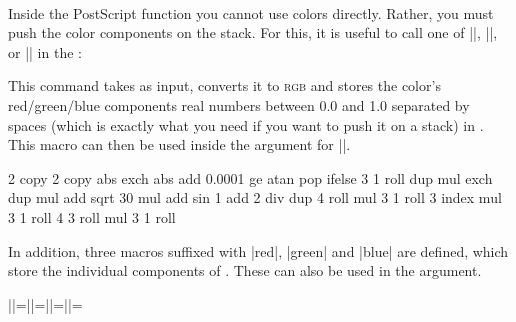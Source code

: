 \begin{command}{\pgfdeclarefunctionalshading{}\\
}
    Inside the PostScript function  you cannot use colors
    directly. Rather, you must push the color components on the stack. For
    this, it is useful to call one of |\pgfshadecolortorgb|,
    |\pgfshadecolortocmyk|, or |\pgfshadecolortogray| in the :

    \begin{command}{\pgfshadecolortorgb{}}
        This command takes  as input, converts it to
        \textsc{rgb} and stores the color's
        red/green/blue components real numbers between 0.0 and 1.0 separated by
        spaces (which is exactly what you need if you want to push it on a
        stack) in . This macro can then be used inside the
         argument for |\pgfdeclarefunctionalshading|.
\begin{codeexample}[]
{\pgfpoint{1cm}{1cm}}{}{
  2 copy        %
  2 copy abs exch abs add 0.0001 ge { atan } { pop } ifelse
  3 1 roll
  dup mul exch
  dup mul add sqrt
  30 mul
  add
  sin
  1 add 2 div
  dup
   4 roll      %
  mul
  3 1 roll
  3 index
  mul
  3 1 roll
  4 3 roll
  mul
  3 1 roll
}
%
%
%
\end{codeexample}

        In addition, three macros suffixed with |red|, |green| and |blue| are
        defined, which store the individual components of .
        These can also be used in the  argument.
\begin{codeexample}[preamble={\usepackage{shortvrb} \MakeShortVerb{\|}}]
|\mycol|=\mycol |\mycolred|=\mycolred |\mycolgreen|=\mycolgreen |\mycolblue|=\mycolblue
\end{codeexample}
    \end{command}


\end{command}

